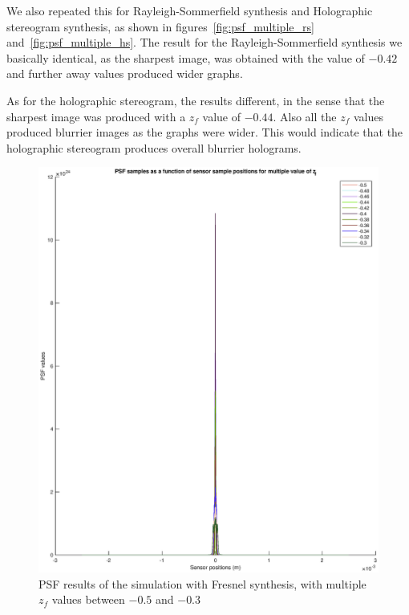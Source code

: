 \documentclass[12pt,a4paper,english
]{tunithesis}
\begin{document}
We also repeated this for Rayleigh-Sommerfield synthesis and Holographic stereogram synthesis, as shown in figures~\ref{fig:psf_multiple_rs} and~\ref{fig:psf_multiple_hs}. The result for the Rayleigh-Sommerfield synthesis we basically identical, as the sharpest image, was obtained with the value of $-0.42$ and further away values produced wider graphs.

As for the holographic stereogram, the results different, in the sense that the sharpest image was produced with a $z_f$ value of $-0.44$. Also all the $z_f$ values produced blurrier images as the graphs were wider. This would indicate that the holographic stereogram produces overall blurrier holograms.

\begin{figure}
  \label{fig:psf_multiple_fresnel}
  \centering
  \includegraphics[width=\columnwidth]{img/psf_multiple_fresnel.eps}
  \caption{PSF results of the simulation with Fresnel synthesis, with multiple $z_f$ values between $-0.5$ and $-0.3$}
\end{figure}
\end{document}
